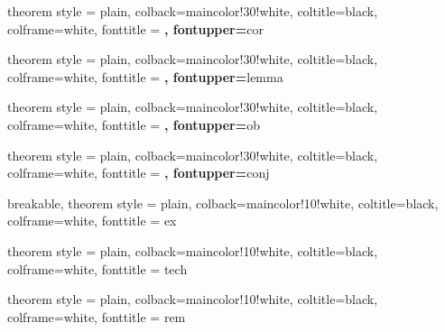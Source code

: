  {theorem style = plain, colback=maincolor!30!white, coltitle=black, colframe=white, fonttitle = \upshape\bfseries,  fontupper=\itshape}{cor}

 {theorem style = plain, colback=maincolor!30!white, coltitle=black, colframe=white, fonttitle = \upshape\bfseries,  fontupper=\itshape}{lemma}

 {theorem style = plain, colback=maincolor!30!white, coltitle=black, colframe=white, fonttitle = \upshape\bfseries,  fontupper=\itshape}{ob}

 {theorem style = plain, colback=maincolor!30!white, coltitle=black, colframe=white, fonttitle = \upshape\bfseries,  fontupper=\itshape}{conj}

 {breakable, theorem style = plain, colback=maincolor!10!white, coltitle=black, colframe=white, fonttitle = \upshape\itshape}{ex}

 {theorem style = plain, colback=maincolor!10!white, coltitle=black, colframe=white, fonttitle = \upshape\itshape}{tech}

 {theorem style = plain, colback=maincolor!10!white, coltitle=black, colframe=white, fonttitle = \upshape\itshape}{rem}

\DeclareMathOperator{\adj}{adj} %
\DeclareMathOperator{\im}{im}
\DeclareMathOperator{\coker}{coker}
\DeclareMathOperator{\cone}{cone}
\DeclareMathOperator{\Tot}{Tot}
\DeclareMathOperator{\Hom}{Hom}
\DeclareMathOperator{\Ext}{Ext}
\DeclareMathOperator{\lExt}{\mathcal{E}\mathit{xt}} %
\DeclareMathOperator{\lHom}{\mathcal{H}\mathit{om}} %
\newcommand{\dL}{\mathbf{L}} %
\newcommand{\dR}{\mathbf{R}} %
\newcommand{\mL}{\mathbb{L}} %
\newcommand{\mR}{\mathbb{R}} %
\DeclareMathOperator{\RHom}{\dR Hom} %
\DeclareMathOperator{\RlHom}{\dR\mathcal{H}\mathit{om}} %
\DeclareMathOperator{\RG}{\dR\Gamma} %
\newcommand{\Lotimes}{\otimes^\dL} %
\newcommand{\lperp}[1]{\prescript{\perp}{}{#1}} %
\DeclareMathOperator{\Spec}{Spec}
\DeclareMathOperator{\Proj}{Proj}
\DeclareMathOperator{\Bl}{Bl}
\DeclareMathOperator{\Ch}{Ch}
\DeclareMathOperator{\Pic}{Pic}
\DeclareMathOperator{\Coh}{Coh}
\DeclareMathOperator{\QCoh}{QCoh}
\DeclareMathOperator{\Perf}{Perf}
\DeclareMathOperator{\DPerf}{\mathfrak{Perf}}
\DeclareMathOperator{\MF}{MF}
\newcommand{\Ab}{\mathrm{Ab}}

